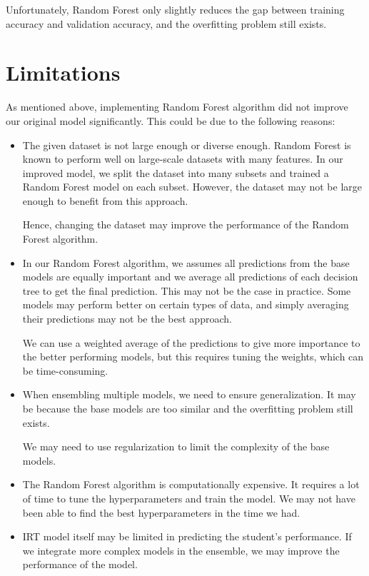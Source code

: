 \documentclass{article}
\begin{document}
Unfortunately, Random Forest only slightly reduces the gap between training accuracy and validation accuracy, and the overfitting problem still exists.

\section*{Limitations}

As mentioned above, implementing Random Forest algorithm did not improve our original model significantly. This could be due to the following reasons:
\begin{itemize}
    \item The given dataset is not large enough or diverse enough. Random Forest is known to perform well on large-scale datasets with many features. In our improved model, we split the dataset into many subsets and trained a Random Forest model on each subset. However, the dataset may not be large enough to benefit from this approach.
    
    Hence, changing the dataset may improve the performance of the Random Forest algorithm.
    
    \item In our Random Forest algorithm, we assumes all predictions from the base models are equally important and we average all predictions of each decision tree to get the final prediction. This may not be the case in practice. Some models may perform better on certain types of data, and simply averaging their predictions may not be the best approach.
    
    We can use a weighted average of the predictions to give more importance to the better performing models, but this requires tuning the weights, which can be time-consuming.

    \item When ensembling multiple models, we need to ensure generalization. It may be because the base models are too similar and the overfitting problem still exists.
    
    We may need to use regularization to limit the complexity of the base models.
   
    \item The Random Forest algorithm is computationally expensive. It requires a lot of time to tune the hyperparameters and train the model. We may not have been able to find the best hyperparameters in the time we had.
   
    \item IRT model itself may be limited in predicting the student's performance. If we integrate more complex models in the ensemble, we may improve the performance of the model.
\end{itemize}
\end{document}
